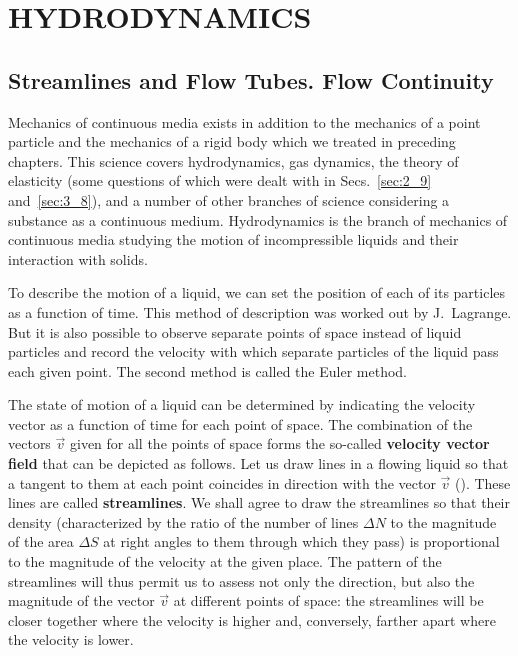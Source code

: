 

\chapter{HYDRODYNAMICS}\label{chap:9}

\section{Streamlines and Flow Tubes. Flow Continuity}\label{sec:9_1}

Mechanics of continuous media exists in addition to the mechanics of a point particle and the mechanics of a rigid body which we treated in preceding chapters. This science covers hydrodynamics, gas dynamics, the theory of elasticity (some questions of which were dealt with in Secs.~\ref{sec:2_9} and~\ref{sec:3_8}), and a number of other branches of science considering a substance as a continuous medium. Hydrodynamics is the branch of mechanics of continuous media studying the motion of incompressible liquids and their interaction with solids.

To describe the motion of a liquid, we can set the position of each of its particles as a function of time. This method of description was worked out by J.~Lagrange. But it is also possible to observe separate points of space instead of liquid particles and record the velocity with which separate particles of the liquid pass each given point. The second method is called the Euler method.

The state of motion of a liquid can be determined by indicating the velocity vector as a function of time for each point of space. The combination of the vectors $\vec{v}$ given for all the points of space forms the so-called \textbf{velocity vector field} that can be depicted as follows. Let us draw lines in a flowing liquid so that a tangent to them at each point coincides in direction with the vector $\vec{v}$ (). These lines are called \textbf{streamlines}. We shall agree to draw the streamlines so that their density (characterized by the ratio of the number of lines $\Delta N$ to the magnitude of the area $\Delta S$ at right angles to them through which they pass) is proportional to the magnitude of the velocity at the given place. The pattern of the streamlines will thus permit us to assess not only the direction, but also the magnitude of the 	vector $\vec{v}$ at different points of space: the streamlines will be closer together where the velocity is higher and, conversely, farther apart where the velocity is lower.

